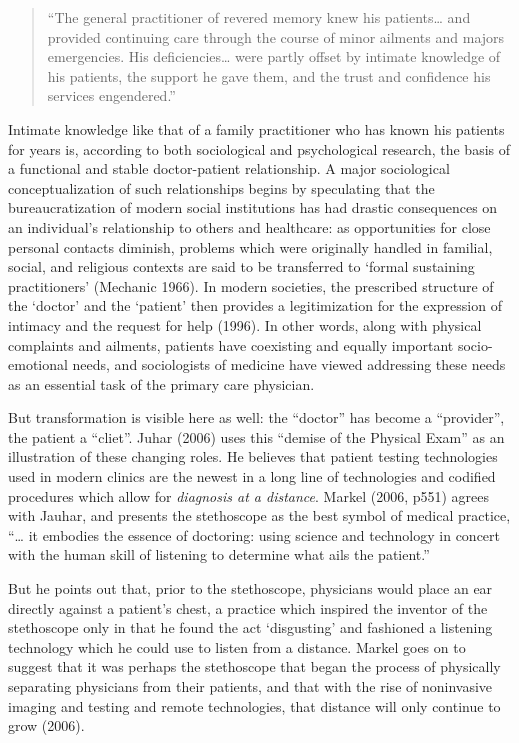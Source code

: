 \documentclass[12pt,twoside]{reedthesis}
\begin{document}
  \singlespace
  
  \begin{quote}
  ``The general practitioner of revered memory knew his patients\ldots{}
  and provided continuing care through the course of minor ailments and
  majors emergencies. His deficiencies\ldots{} were partly offset by
  intimate knowledge of his patients, the support he gave them, and the
  trust and confidence his services engendered.''
  \end{quote}
  
  \doublespacing
  
  Intimate knowledge like that of a family practitioner who has known his
  patients for years is, according to both sociological and psychological
  research, the basis of a functional and stable doctor-patient
  relationship. A major sociological conceptualization of such
  relationships begins by speculating that the bureaucratization of modern
  social institutions has had drastic consequences on an individual's
  relationship to others and healthcare: as opportunities for close
  personal contacts diminish, problems which were originally handled in
  familial, social, and religious contexts are said to be transferred to
  `formal sustaining practitioners' (Mechanic 1966). In modern societies,
  the prescribed structure of the `doctor' and the `patient' then provides
  a legitimization for the expression of intimacy and the request for help
  (1996). In other words, along with physical complaints and ailments,
  patients have coexisting and equally important socio-emotional needs,
  and sociologists of medicine have viewed addressing these needs as an
  essential task of the primary care physician.
  
  But transformation is visible here as well: the ``doctor'' has become a
  ``provider'', the patient a ``cliet''. Juhar (2006) uses this ``demise
  of the Physical Exam'' as an illustration of these changing roles. He
  believes that patient testing technologies used in modern clinics are
  the newest in a long line of technologies and codified procedures which
  allow for \emph{diagnosis at a distance}. Markel (2006, p551) agrees
  with Jauhar, and presents the stethoscope as the best symbol of medical
  practice, ``\ldots{} it embodies the essence of doctoring: using science
  and technology in concert with the human skill of listening to determine
  what ails the patient.''
  
  But he points out that, prior to the stethoscope, physicians would place
  an ear directly against a patient's chest, a practice which inspired the
  inventor of the stethoscope only in that he found the act `disgusting'
  and fashioned a listening technology which he could use to listen from a
  distance. Markel goes on to suggest that it was perhaps the stethoscope
  that began the process of physically separating physicians from their
  patients, and that with the rise of noninvasive imaging and testing and
  remote technologies, that distance will only continue to grow (2006).
  
\end{document}
